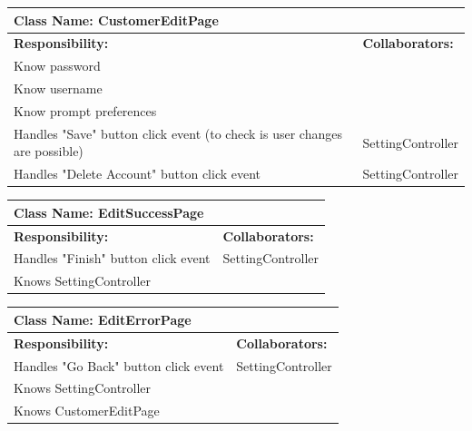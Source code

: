 \documentclass[]{article}
\begin{document}
	\begin{table}[H]
	\centering
	\begin{tabular}{|p{6cm}|p{6cm}|}
	\hline 
		\multicolumn{2}{|l|}{\textbf{Class Name: CustomerEditPage}} \\
	\hline
	\textbf{Responsibility:} & \textbf{Collaborators:} \\
	\hline 
	Know password & \\ \hline
	Know username & \\ \hline
	Know prompt preferences & \\ \hline
	Handles "Save" button click event  (to check is user changes are possible) & SettingController\\ \hline 
	Handles "Delete Account" button click event  & SettingController\\ \hline
	\end{tabular}
	\end{table}
	
	\begin{table}[H]
	\centering
	\begin{tabular}{|p{6cm}|p{6cm}|}
	\hline 
		\multicolumn{2}{|l|}{\textbf{Class Name: EditSuccessPage}} \\
	\hline
	\textbf{Responsibility:} & \textbf{Collaborators:} \\
	\hline 
	Handles "Finish" button click event  & SettingController\\ \hline 
	Knows SettingController &\\ \hline
	\end{tabular}
	\end{table}
	
	\begin{table}[H]
	\centering
	\begin{tabular}{|p{6cm}|p{6cm}|}
	\hline 
		\multicolumn{2}{|l|}{\textbf{Class Name: EditErrorPage}} \\
	\hline
	\textbf{Responsibility:} & \textbf{Collaborators:} \\
	\hline 
	Handles "Go Back" button click event  & SettingController\\ \hline 
	Knows SettingController &\\ \hline
	Knows CustomerEditPage &\\ \hline
	\end{tabular}
	\end{table}
	
\end{document}
